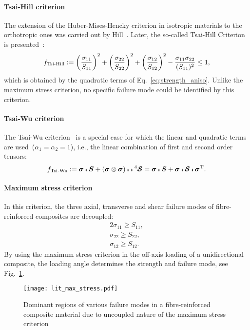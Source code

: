 	\paragraph{Tsai-Hill criterion} The extension of the Huber-Mises-Hencky criterion in isotropic materials to the orthotropic ones was carried out by Hill~\autocite{Hill.1998}. Later, the so-called Tsai-Hill Criterion is presented~\parencite{Azzi.1966}:
	\begin{equation}
		f_\text{Tsi-Hill}\mathrel{:=} \left(\frac{\sigma_{11}}{S_{11}}\right)^2 + \left(\frac{\sigma_{22}}{S_{22}}\right)^2 + \left(\frac{\sigma_{12}}{S_{12}}\right)^2 - \frac{\sigma_{11}\sigma_{22}}{(S_{11})^2} \le 1,
	\end{equation}
	which is obtained by the quadratic terms of Eq.~\eqref{eq:strength_aniso}. Unlike the maximum stress criterion, no specific failure mode could be identified by this criterion.
	
	
	\paragraph{Tsai-Wu criterion} The Tsai-Wu criterion~\autocite{Tsai.1971} is a special case for which the linear and quadratic terms are used~($\alpha_1=\alpha_2=1$), i.e., the linear combination of first and second order tensors:
	\begin{equation}
		f_\text{Tsi-Wu}\equidef \tenb{\sigma}\dscp\tenb{S} + (\tenb{\sigma}\dyad\tenb{\sigma})\dscp\dscp\tenn{S}{4} =\tenb{\sigma}\dscp\tenb{S} + \tenb{\sigma}\dscp\tend{S}\dscp\tenb{\sigma}^\tran.
	\end{equation}	 



	
	\paragraph{Maximum stress criterion} In this criterion, the three axial, transverse and shear failure modes of fibre-reinforced composites are decoupled:
	\begin{alignat}{2}
		\sigma_{11} \ge S_{11},\\
		\sigma_{22} \ge S_{22},\\
		\sigma_{12} \ge S_{12}.
	\end{alignat}
	By using the maximum stress criterion in the off-axis loading of a unidirectional composite, the loading angle determines the strength and failure mode, see Fig.~\ref{fig:max_stress_crit}.
\begin{figure}[!h]
\centering
\texttt{[image: lit\_max\_stress.pdf]}
\caption{Dominant regions of various failure modes in a fibre-reinforced composite material due to uncoupled nature of the maximum stress criterion}\label{fig:max_stress_crit}
\end{figure}



